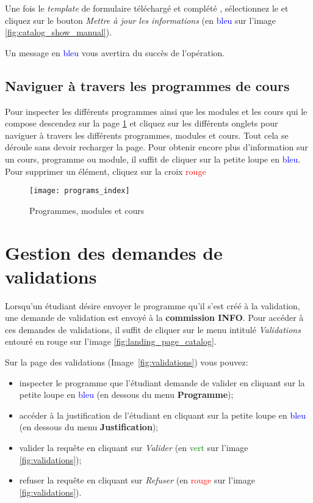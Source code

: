 Une fois le \textit{template} de formulaire téléchargé et complété , sélectionnez le et cliquez sur le bouton \textit{Mettre à jour les informations} (en \textcolor{blue}{bleu} sur l'image \ref{fig:catalog_show_manual}).


Un message en \textcolor{blue}{bleu} vous avertira du succès de l'opération.


\subsection{Naviguer à travers les programmes de cours}

Pour inspecter les différents programmes ainsi que les modules et les cours qui le compose descendez sur la page \ref{fig:programs_index} et cliquez sur les différents onglets pour naviguer à travers les différents programmes, modules et cours. Tout cela se déroule sans devoir recharger la page. Pour obtenir encore plus d'information sur un cours, programme ou module, il suffit de cliquer sur la petite loupe en \textcolor{blue}{bleu}. Pour supprimer un élément, cliquez sur la croix \textcolor{red}{rouge}

\begin{figure}[htb]
\centering
\caption{Programmes, modules et cours}
\label{fig:programs_index}
\texttt{[image: programs\_index]}

\end{figure}



\section{Gestion des demandes de validations}
Lorsqu'un étudiant désire envoyer le programme qu'il s'est créé à la validation, une demande de validation est envoyé à la \textbf{commission INFO}. Pour accéder à ces demandes de validations, 
il suffit de cliquer sur le menu intitulé \textit{Validations} entouré en rouge sur l'image \ref{fig:landing_page_catalog}.

Sur la page des validations (Image~\ref{fig:validations}) vous pouvez:
\begin{itemize}
\item inspecter le programme que l'étudiant demande de valider en cliquant sur la petite loupe en \textcolor{blue}{bleu} (en dessous du menu \textbf{Programme});
\item accéder à la justification de l'étudiant en cliquant sur la petite loupe en \textcolor{blue}{bleu} (en dessous du menu \textbf{Justification});
\item valider la requête en cliquant sur \textit{Valider} (en \textcolor{green}{vert} sur l'image \ref{fig:validations});
\item refuser la requête en cliquant sur \textit{Refuser} (en \textcolor{red}{rouge} sur l'image \ref{fig:validations}).
\end{itemize}

